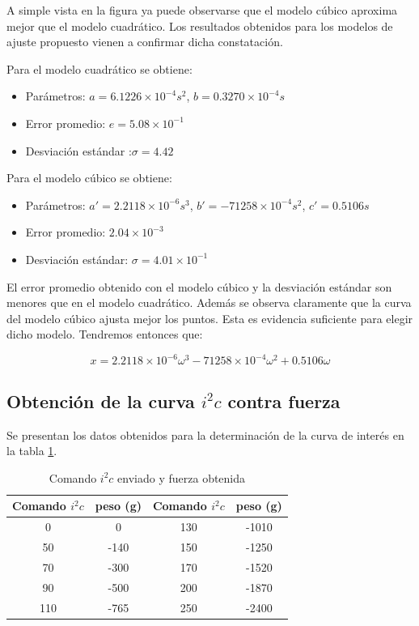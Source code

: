 \documentclass[main]{subfiles}
\begin{document}
A simple vista en la figura ya puede observarse que el modelo c\'ubico aproxima mejor que el modelo cuadr\'atico.
Los resultados obtenidos para los modelos de ajuste propuesto vienen a confirmar dicha constataci\'on.

Para el modelo cuadr\'atico se obtiene:
\begin{itemize}
\item Par\'ametros: $a=6.1226\times10^{-4}s^2$, $b=0.3270\times 10^{-4}s$
\item Error promedio: $e=5.08\times 10 ^{-1}$
\item Desviaci\'on est\'andar :$\sigma=4.42$
\end{itemize}

Para el modelo c\'ubico se obtiene:
\begin{itemize}
\item Par\'ametros: $a\prime = 2.2118\times 10^{-6}s^3$, $b\prime =-71258\times 10^{-4}s^2$, $c\prime=0.5106s$
\item Error promedio: $2.04\times10^{-3} $
\item Desviaci\'on est\'andar: $\sigma=4.01\times 10^{-1}$
\end{itemize}

El error promedio obtenido con el modelo c\'ubico y la desviaci\'on est\'andar son menores que en el modelo cuadr\'atico. Adem\'as se observa claramente que la curva del modelo c\'ubico ajusta mejor los puntos. Esta es evidencia suficiente para elegir dicho modelo. Tendremos entonces que:

$$
x=2.2118\times 10^{-6}\omega^3 -71258\times 10^{-4}\omega^2+0.5106\omega
$$
\subsection{Obtenci\'on de la curva $i^2c$ contra fuerza}
Se presentan los datos obtenidos para la determinaci\'on de la curva de inter\'es en la tabla \ref{tab:if}.
\begin{table}[H]
\centering
\begin{tabular}{|c|c|c|c|} 
	\hline
	\cellcolor[gray]{0.8} \textbf{Comando $i^2c$} & 
	\cellcolor[gray]{0.8} \textbf{peso (g)} & \cellcolor[gray]{0.8} \textbf{Comando $i^2c$} & 
	\cellcolor[gray]{0.8} \textbf{peso (g)}\\ \hline \hline
	  0 &      0  & 130 &-1010\\ \hline
	 50 &-140 &150 &-1250\\ \hline
	 70 &-300 &170 &-1520\\ \hline
	 90 & -500&200 &-1870 \\ \hline
	110 & -765 &250&-2400\\ \hline
\end{tabular}
\caption{Comando $i^2c$ enviado y fuerza obtenida}
\label{tab:if}
\end{table}
\end{document}
